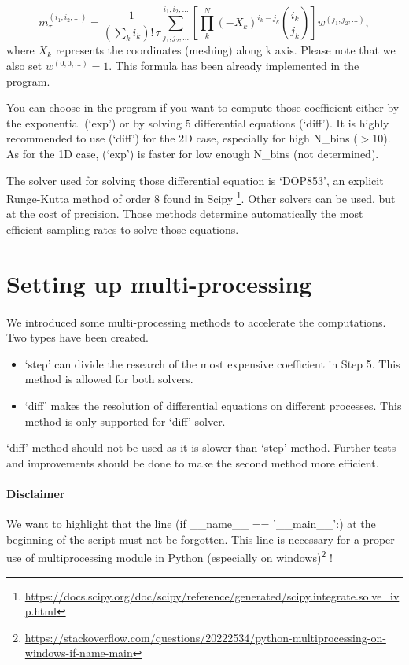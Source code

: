 \documentclass[A4paper]{article}
\begin{document}
 \begin{equation}
 m_\tau^{(i_1,i_2,\ldots)} = \frac{1}{(\sum_k i_k)! \, \tau} \sum_{j_1,j_2,\ldots}^{i_1,i_2,\ldots} \left[ \prod_k^N (-X_k)^{i_k - j_k} \binom{i_k}{j_k} \right] w^{(j_1,j_2,\ldots)},
 \end{equation}
where $X_k$ represents the coordinates (meshing) along k axis. Please note that we also set $w^{(0,0,\ldots)} = 1$. This formula has been already implemented in the program.

You can choose in the program if you want to compute those coefficient either by the exponential (`exp') or by solving 5 differential equations (`diff'). It is highly recommended to use (`diff') for the 2D case, especially for high N\_bins ($>10$). As for the 1D case, (`exp') is faster for low enough N\_bins (not determined).
 
The solver used for solving those differential equation is `DOP853', an explicit Runge-Kutta method of order 8 found in Scipy \footnote{\url{https://docs.scipy.org/doc/scipy/reference/generated/scipy.integrate.solve_ivp.html}}. Other solvers can be used, but at the cost of precision. Those methods determine automatically the most efficient sampling rates to solve those equations.

\section{Setting up multi-processing}
\paragraph{}
We introduced some multi-processing methods to accelerate the computations. Two types have been created. 

\begin{itemize}
\item `step' can divide the research of the most expensive coefficient in Step 5. This method is allowed for both solvers. 

\item `diff' makes the resolution of differential equations on different processes. This method is only supported for `diff' solver.
\end{itemize}
%
`diff' method should not be used as it is slower than `step' method. Further tests and improvements should be done to make the second method more efficient.

\paragraph{Disclaimer}
We want to highlight that the line (if \_\_name\_\_ == '\_\_main\_\_':) at the beginning of the script must not be forgotten. This line is necessary for a proper use of multiprocessing module in Python (especially on windows)\footnote{\url{https://stackoverflow.com/questions/20222534/python-multiprocessing-on-windows-if-name-main}} !
\end{document}
